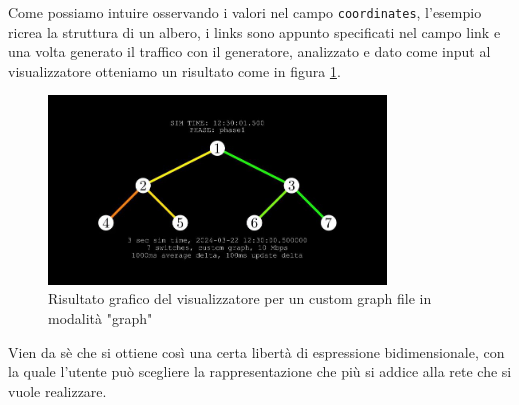 \documentclass[binding=0.6cm]{sapthesis}
\begin{document}
Come possiamo intuire osservando i valori nel campo \texttt{coordinates}, l'esempio ricrea la struttura di un albero, i links sono appunto specificati 
nel campo link e una volta generato il traffico con il generatore, analizzato e dato come input 
al visualizzatore otteniamo un risultato come in figura \ref{fig:tree_custom}.
\newline
\begin{figure}[h]
    \centering
    \includegraphics[width=0.8\textwidth]{immagini/free_graph.JPG}
    \caption{Risultato grafico del visualizzatore per un custom graph file in modalità "graph"}
    \label{fig:tree_custom}
\end{figure}
Vien da sè che si ottiene così una certa libertà di espressione bidimensionale, con la quale l'utente può scegliere
la rappresentazione che più si addice alla rete che si vuole realizzare.
\end{document}
